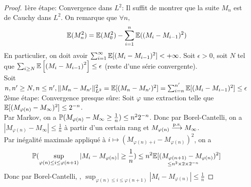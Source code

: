 \documentclass[]{report}
\begin{document}
    \begin{proof}
        1ère étape: Convergence dans $L^2$: Il suffit de montrer que la suite $M_n$ est de Cauchy dans $L^2$. On remarque que $\forall n,$
        \[\mathbb{E}(M_n^2)=\mathbb{E}(M_0^2)-\sum_{i=1}^n \mathbb{E}((M_i-M_{i-1})^2)\]
        En particulier, on doit avoir $\sum_{i=1}^\infty \mathbb{E}[(M_i-M_{i-1})^2]<+\infty$. Soit $\epsilon>0$, soit $N$ tel que $\sum_{i\ge N}\mathbb{E} \left[\left(M_i-M_{i-1}\right)^2\right]\le \epsilon$ (reste d'une série convergente).\\
        Soit $n,n'\ge N,n\le n', \lVert M_n-M_{n'} \rVert_{L^2}^2=\mathbb{E}[(M_n-M_{n'})^2]=\sum_{i=n}^{n'}\mathbb{E}[(M_i-M_{i-1})^2]\le \epsilon$\\
        2ème étape: Convergence presque sûre: Soit $\varphi$ une extraction telle que $\mathbb{E}[(M_{\varphi(n)}-M_\infty)^2]\le 2^{-n}$.\\
        Par Markov, on a $\mathbb{P}(M_{\varphi(n)}-M_\infty\ge \frac{1}{n})\le n^2 2^{-n}$. Donc par Borel-Cantelli, on a $|M_{\varphi(n)}-M_\infty|\le \frac{1}{n}$ à partir d'un certain rang et $M_{\varphi(n)}\overset{\text{p.s.}}{\longrightarrow} M_\infty$.\\
        Par  inégalité maximale appliqué à $i\mapsto (M_{\varphi(n)+i}-M_{\varphi(n)})^2$, on a
        \[\mathbb{P}(\sup_{\varphi(n)\le i \le \varphi(n+1)} |M_i-M_{\varphi(n)}|\ge \frac{1}{n})\le \underset{\le n^2 \times2\times 2^{-n}}{n^2 \mathbb{E}[(M_{\varphi(n+1)}-M_{\varphi(n)})^2]}\]
        Donc par Borel-Cantelli, \apcr, $\sup_{\varphi(n)\le i\le \varphi(n+1)}|M_i-M_{\varphi(n)}|\le \frac{1}{n}$
    \end{proof}
\end{document}
